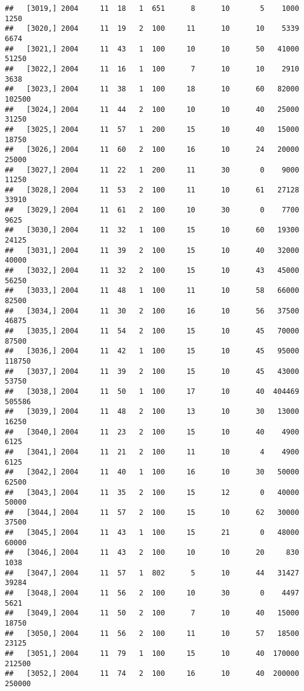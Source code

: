 \documentclass{article}\usepackage[]{graphicx}\usepackage[]{color}
\makeatletter
\newenvironment{kframe}{%
 \def\at@end@of@kframe{}%
 \ifinner\ifhmode%
  \def\at@end@of@kframe{\end{minipage}}%
  \begin{minipage}{\columnwidth}%
 \fi\fi%
 \def\FrameCommand##1{\hskip\@totalleftmargin \hskip-\fboxsep
 \colorbox{shadecolor}{##1}\hskip-\fboxsep
     \hskip-\linewidth \hskip-\@totalleftmargin \hskip\columnwidth}%
 \MakeFramed {\advance\hsize-\width
   \@totalleftmargin\z@ \linewidth\hsize
   \@setminipage}}%
 {\par\unskip\endMakeFramed%
 \at@end@of@kframe}
\newenvironment{knitrout}{}{} %
\makeatother
\begin{document}
\begin{knitrout}
\begin{kframe}
\begin{verbatim}
##   [3019,] 2004     11  18   1  651      8      10       5    1000    1250
##   [3020,] 2004     11  19   2  100     11      10      10    5339    6674
##   [3021,] 2004     11  43   1  100     10      10      50   41000   51250
##   [3022,] 2004     11  16   1  100      7      10      10    2910    3638
##   [3023,] 2004     11  38   1  100     18      10      60   82000  102500
##   [3024,] 2004     11  44   2  100     10      10      40   25000   31250
##   [3025,] 2004     11  57   1  200     15      10      40   15000   18750
##   [3026,] 2004     11  60   2  100     16      10      24   20000   25000
##   [3027,] 2004     11  22   1  200     11      30       0    9000   11250
##   [3028,] 2004     11  53   2  100     11      10      61   27128   33910
##   [3029,] 2004     11  61   2  100     10      30       0    7700    9625
##   [3030,] 2004     11  32   1  100     15      10      60   19300   24125
##   [3031,] 2004     11  39   2  100     15      10      40   32000   40000
##   [3032,] 2004     11  32   2  100     15      10      43   45000   56250
##   [3033,] 2004     11  48   1  100     11      10      58   66000   82500
##   [3034,] 2004     11  30   2  100     16      10      56   37500   46875
##   [3035,] 2004     11  54   2  100     15      10      45   70000   87500
##   [3036,] 2004     11  42   1  100     15      10      45   95000  118750
##   [3037,] 2004     11  39   2  100     15      10      45   43000   53750
##   [3038,] 2004     11  50   1  100     17      10      40  404469  505586
##   [3039,] 2004     11  48   2  100     13      10      30   13000   16250
##   [3040,] 2004     11  23   2  100     15      10      40    4900    6125
##   [3041,] 2004     11  21   2  100     11      10       4    4900    6125
##   [3042,] 2004     11  40   1  100     16      10      30   50000   62500
##   [3043,] 2004     11  35   2  100     15      12       0   40000   50000
##   [3044,] 2004     11  57   2  100     15      10      62   30000   37500
##   [3045,] 2004     11  43   1  100     15      21       0   48000   60000
##   [3046,] 2004     11  43   2  100     10      10      20     830    1038
##   [3047,] 2004     11  57   1  802      5      10      44   31427   39284
##   [3048,] 2004     11  56   2  100     10      30       0    4497    5621
##   [3049,] 2004     11  50   2  100      7      10      40   15000   18750
##   [3050,] 2004     11  56   2  100     11      10      57   18500   23125
##   [3051,] 2004     11  79   1  100     15      10      40  170000  212500
##   [3052,] 2004     11  74   2  100     16      10      40  200000  250000

\end{verbatim}
\end{kframe}
\end{knitrout}
\end{document}
